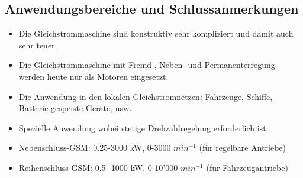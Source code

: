 \subsection{Anwendungsbereiche und Schlussanmerkungen}
\begin{itemize}
\item Die Gleichstrommaschine sind konstruktiv sehr kompliziert und damit auch sehr teuer.
\item Die Gleichstrommaschine mit Fremd-, Neben- und Permanenterregung werden heute nur als Motoren eingesetzt.
\item Die Anwendung in den lokalen Gleichstromnetzen: Fahrzeuge, Schiffe, Batterie-gespeiste Geräte, usw.
\item Spezielle Anwendung wobei stetige Drehzahlregelung erforderlich ist:
\item Nebenschluss-GSM: 0.25-3000 kW, 0-3000 $min^{-1}$ (für regelbare Antriebe)
\item Reihenschluss-GSM: 0.5 -1000 kW, 0-10'000 $min^{-1}$ (für Fahrzeugantriebe)
\end{itemize}